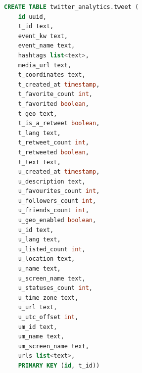\begin{lstlisting}[language=SQL, caption={Tweets CQL table script}, float, floatplacement=H, label={lst:cql}]
CREATE TABLE twitter_analytics.tweet (
    id uuid,
    t_id text,
    event_kw text,
    event_name text,
    hashtags list<text>,
    media_url text,
    t_coordinates text,
    t_created_at timestamp,
    t_favorite_count int,
    t_favorited boolean,
    t_geo text,
    t_is_a_retweet boolean,
    t_lang text,
    t_retweet_count int,
    t_retweeted boolean,
    t_text text,
    u_created_at timestamp,
    u_description text,
    u_favourites_count int,
    u_followers_count int,
    u_friends_count int,
    u_geo_enabled boolean,
    u_id text,
    u_lang text,
    u_listed_count int,
    u_location text,
    u_name text,
    u_screen_name text,
    u_statuses_count int,
    u_time_zone text,
    u_url text,
    u_utc_offset int,
    um_id text,
    um_name text,
    um_screen_name text,
    urls list<text>,
    PRIMARY KEY (id, t_id))
\end{lstlisting}

